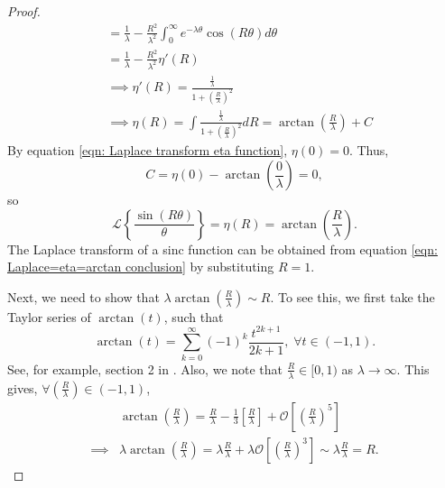 \documentclass[%
 reprint,
 amsmath,amssymb,
 aps,
]{revtex4-2}
\begin{document}
\begin{proof}
\begin{align*}
    & = \frac{1}{\lambda} - \frac{R^2}{\lambda^2}\int_0^\infty e^{-\lambda\theta} \cos(R\theta) d\theta \\
    & = \frac{1}{\lambda} - \frac{R^2}{\lambda^2} \eta'(R)\\
    & \implies \eta'(R) = \frac{\frac{1}{\lambda}}{1 + \left(\frac{R}{\lambda} \right)^2}\\
    & \implies \eta(R) = \int \frac{\frac{1}{\lambda}}{1 + \left(\frac{R}{\lambda} \right)^2} dR = \arctan\left(\frac{R}{\lambda} \right) + C
\end{align*}
By equation \eqref{eqn: Laplace transform eta function}, $\eta(0) = 0$. Thus,
\begin{equation*}
    C = \eta(0) - \arctan\left(\frac{0}{\lambda} \right) = 0,
\end{equation*}
so
\begin{equation} \label{eqn: Laplace=eta=arctan conclusion}
    \mathcal{L}\left\{\frac{\sin(R\theta)}{\theta}\right\} = \eta(R) = \arctan\left(\frac{R}{\lambda} \right).
\end{equation}
The Laplace transform of a sinc function can be obtained from equation \eqref{eqn: Laplace=eta=arctan conclusion} by substituting $R=1$.

Next, we need to show that $\lambda \arctan\left(\frac{R}{\lambda} \right) \sim R$. To see this, we first take the Taylor series of $\arctan(t)$, such that
\begin{equation*}
    \arctan(t) = \sum_{k = 0}^\infty (-1)^k \frac{t^{2k+1}}{2k+1}, \; \forall t \in (-1, 1).
\end{equation*}
See, for example, section 2 in \cite{nimbran2015taylor}. Also, we note that $\displaystyle \frac{R}{\lambda} \in [0, 1)$ as $\lambda \to \infty$. This gives, $\displaystyle \forall \left(\frac{R}{\lambda}\right) \in (-1, 1)$,
\begin{align*}
    & \arctan\left(\frac{R}{\lambda} \right)
    = \frac{R}{\lambda} - \frac{1}{3}\left[\frac{R}{\lambda} \right] + \mathcal{O}\left[\left(\frac{R}{\lambda} \right)^5 \right] \\
    \implies & \lambda \arctan\left(\frac{R}{\lambda} \right) = \lambda \frac{R}{\lambda} + \lambda \mathcal{O}\left[\left(\frac{R}{\lambda} \right)^3 \right] \sim \lambda \frac{R}{\lambda} = R.
\end{align*}
\end{proof}
\end{document}
